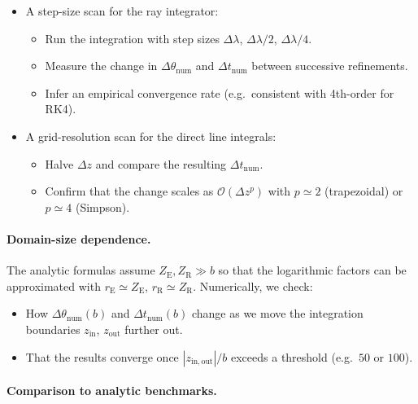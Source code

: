 \documentclass[11pt]{article}
\begin{document}
\begin{itemize}
  \item A step-size scan for the ray integrator:
        \begin{itemize}
          \item Run the integration with step sizes
                $\Delta\lambda$, $\Delta\lambda/2$, $\Delta\lambda/4$.
          \item Measure the change in $\Delta\theta_\mathrm{num}$ and
                $\Delta t_\mathrm{num}$ between successive refinements.
          \item Infer an empirical convergence rate (e.g.\ consistent with
                4th-order for RK4).
        \end{itemize}
  \item A grid-resolution scan for the direct line integrals:
        \begin{itemize}
          \item Halve $\Delta z$ and compare the resulting
                $\Delta t_\mathrm{num}$.
          \item Confirm that the change scales as $\mathcal{O}(\Delta z^p)$
                with $p\simeq2$ (trapezoidal) or $p\simeq4$ (Simpson).
        \end{itemize}
\end{itemize}

\paragraph{Domain-size dependence.}

The analytic formulas assume $Z_\mathrm{E},Z_\mathrm{R}\gg b$ so that the
logarithmic factors can be approximated with $r_\mathrm{E}\simeq Z_\mathrm{E}$,
$r_\mathrm{R}\simeq Z_\mathrm{R}$.
Numerically, we check:

\begin{itemize}
  \item How $\Delta\theta_\mathrm{num}(b)$ and
        $\Delta t_\mathrm{num}(b)$ change as we move the integration
        boundaries $z_\mathrm{in}$, $z_\mathrm{out}$ further out.
  \item That the results converge once $|z_\mathrm{in,out}|/b$ exceeds a
        threshold (e.g.\ $50$ or $100$).
\end{itemize}

\paragraph{Comparison to analytic benchmarks.}
\end{document}
